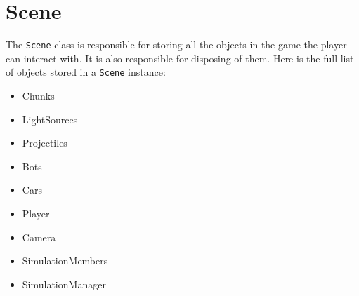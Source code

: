 \section{Scene}

The \texttt{Scene} class is responsible for storing all the objects in the game the player can interact with.
It is also responsible for disposing of them.
Here is the full list of objects stored in a \texttt{Scene} instance:

\begin{itemize}
  \item Chunks
  \item LightSources
  \item Projectiles
  \item Bots
  \item Cars
  \item Player
  \item Camera
  \item SimulationMembers
  \item SimulationManager
\end{itemize}


